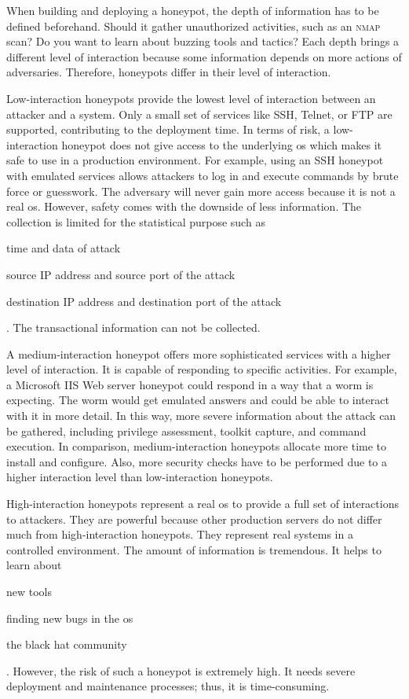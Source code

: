 When building and deploying a honeypot, the depth of information has to be defined beforehand.
Should it gather unauthorized activities, such as an \textsc{nmap} scan?
Do you want to learn about buzzing tools and tactics?
Each depth brings a different level of interaction because some information depends on more actions of adversaries.
Therefore, honeypots differ in their level of interaction.

Low-interaction honeypots provide the lowest level of interaction between an attacker and a system.
Only a small set of services like SSH, Telnet, or FTP are supported, contributing to the deployment time.
In terms of risk, a low-interaction honeypot does not give access to the underlying \ac{os} which makes it safe to use in a production environment.
For example, using an SSH honeypot with emulated services allows attackers to log in and execute commands by brute force or guesswork.
The adversary will never gain more access because it is not a real \ac{os}.
However, safety comes with the downside of less information.
The collection is limited for the statistical purpose such as
\begin{enumerate*}[label=(\roman*)]
    \item time and data of attack
    \item source IP address and source port of the attack
    \item destination IP address and destination port of the attack
\end{enumerate*}.
The transactional information can not be collected. \cite{Spitzner2003}

A medium-interaction honeypot offers more sophisticated services with a higher level of interaction.
It is capable of responding to specific activities.
For example, a Microsoft IIS Web server honeypot could respond in a way that a worm is expecting.
The worm would get emulated answers and could be able to interact with it in more detail.
In this way, more severe information about the attack can be gathered, including privilege assessment, toolkit capture, and command execution.
In comparison, medium-interaction honeypots allocate more time to install and configure.
Also, more security checks have to be performed due to a higher interaction level than low-interaction honeypots. \cite{Spitzner2003}

High-interaction honeypots represent a real \ac{os} to provide a full set of interactions to attackers.
They are powerful because other production servers do not differ much from high-interaction honeypots.
They represent real systems in a controlled environment.
The amount of information is tremendous. It helps to learn about
\begin{enumerate*}[label=(\roman*)]
    \item new tools
    \item finding new bugs in the \ac{os}
    \item the black hat community
\end{enumerate*}. However, the risk of such a honeypot is extremely high.
It needs severe deployment and maintenance processes; thus, it is time-consuming.

